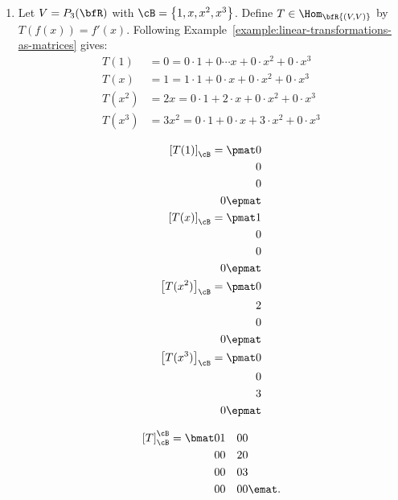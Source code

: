     \begin{example}
        \phantom{a}
        \begin{enumerate}[label = (\arabic*)]
            \item Let $V = P_3(\bfR)$ with $\cB = \left\{ 1,x,x^2,x^3 \right\}$. Define $T \in \Hom_\bfR{(V,V)}$ by $T(f(x)) = f'(x)$. Following Example~\ref{example:linear-transformations-as-matrices} gives:
            \begin{equation*}
            \begin{split}
                T(1) &=  0 =0\cdot 1 + 0 \cdots x + 0 \cdot x^2 + 0 \cdot x^3 \\
                T(x) & = 1 = 1 \cdot 1 + 0 \cdot x + 0 \cdot x^2 + 0 \cdot x^3 \\
                T(x^2) & = 2x = 0 \cdot 1 + 2 \cdot x + 0 \cdot x^2 + 0 \cdot x^3 \\
                T(x^3) & = 3x^2 = 0 \cdot 1 + 0 \cdot x + 3 \cdot x^2 + 0 \cdot x^3
            \end{split}
            \end{equation*}

            \begin{equation*}
            \begin{split}
                \left[ T(1) \right]_\cB = \pmat 0 \\ 0 \\ 0 \\ 0 \epmat\\
                \left[ T(x) \right]_\cB = \pmat 1 \\ 0 \\ 0 \\ 0 \epmat\\
                \left[ T(x^2) \right]_\cB = \pmat 0 \\ 2 \\ 0 \\ 0\epmat\\
                \left[ T(x^3) \right]_\cB = \pmat 0 \\ 0 \\ 3 \\ 0\epmat\\
            \end{split}
            \end{equation*}

            \begin{equation*}
            \begin{split}
                \left[ T \right]_\cB^\cB =  \bmat 0 & 1 & 0 & 0 \\ 0& 0&2&0\\0&0&0&3\\0&0&0&0\emat.
            \end{split}
            \end{equation*}


\end{enumerate}
\end{example}
